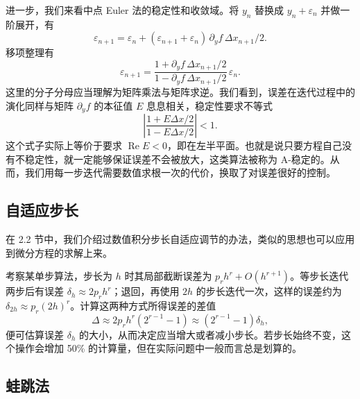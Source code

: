 进一步，我们来看中点 Euler 法的稳定性和收敛域。将 $y_n$ 替换成 $y_n+\varepsilon_n$ 并做一阶展开，有
\[
\varepsilon_{n+1}=\varepsilon_n+(\varepsilon_{n+1}+\varepsilon_n)\,\partial_yf\,\Delta x_{n+1}/2.
\]
移项整理有
\begin{equation}
\varepsilon_{n+1}=\frac{1+\partial_yf\,\Delta x_{n+1}/2}{1-\partial_yf\,\Delta x_{n+1}/2}\,\varepsilon_n.
\tag{2.6.11}
\end{equation}
这里的分子分母应当理解为矩阵乘法与矩阵求逆。我们看到，误差在迭代过程中的演化同样与矩阵 $\partial_yf$ 的本征值 $E$ 息息相关，稳定性要求不等式
\begin{equation}
\left|\frac{1+E\Delta x/2}{1-E\Delta x/2}\right|<1.
\tag{2.6.12}
\end{equation}
这个式子实际上等价于要求 $\operatorname{Re}E<0$，即在左半平面。也就是说只要方程自己没有不稳定性，就一定能够保证误差不会被放大，这类算法被称为 A-稳定的。从而，我们用每一步迭代需要数值求根一次的代价，换取了对误差很好的控制。

\subsection{自适应步长}

在 2.2 节中，我们介绍过数值积分步长自适应调节的办法，类似的思想也可以应用到微分方程的求解上来。

考察某单步算法，步长为 $h$ 时其局部截断误差为 $p_r h^r+O(h^{r+1})$。等步长迭代两步后有误差 $\delta_h\approx2p_rh^r$；退回，再使用 $2h$ 的步长迭代一次，这样的误差约为 $\delta_{2h}\approx p_r(2h)^r$。计算这两种方式所得误差的差值
\begin{equation}
\Delta\approx 2p_rh^r(2^{r-1}-1)\approx(2^{r-1}-1)\delta_h,
\tag{2.6.13}
\end{equation}
便可估算误差 $\delta_h$ 的大小，从而决定应当增大或者减小步长。若步长始终不变，这个操作会增加 50\% 的计算量，但在实际问题中一般而言总是划算的。

\subsection{蛙跳法}

